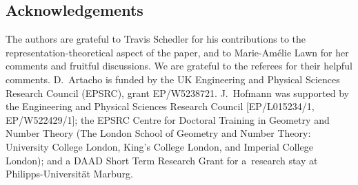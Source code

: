 \documentclass[pdftex]{sigma}
\numberwithin{equation}{section}
\begin{document}
\subsection*{Acknowledgements}
		
The authors are grateful to Travis Schedler for his contributions to the representation-theoretical aspect of the paper, and to Marie-Am\'elie Lawn for her comments and fruitful discussions. We are grateful to the referees for their helpful comments.
D.~Artacho is funded by the UK Engineering and Physical Sciences Research Council (EPSRC), grant EP/W5238721. J.~Hofmann was supported by the Engineering and Physical Sciences Research Council [EP/L015234/1, EP/W522429/1]; the EPSRC Centre for Doctoral Training in Geometry and Number Theory (The London School of Geometry and Number Theory: University College London, King's College London, and Imperial College London); and a DAAD Short Term Research Grant for a~research stay at Philipps-Universit\"{a}t Marburg.
		
\end{document}
